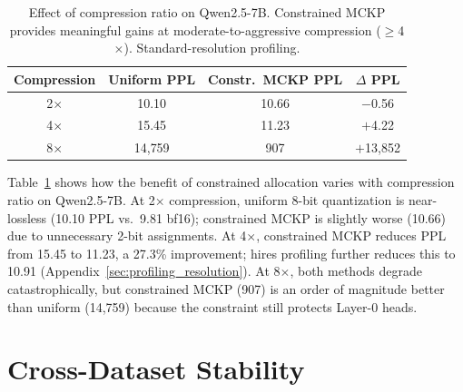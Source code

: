 \begin{table}[t]
\centering
\small
\caption{Effect of compression ratio on Qwen2.5-7B. Constrained MCKP provides meaningful gains at moderate-to-aggressive compression ($\geq$4$\times$). Standard-resolution profiling.}
\label{tab:budget_sweep}
\begin{tabular}{cccc}
\toprule
Compression & Uniform PPL & Constr.\ MCKP PPL & $\Delta$ PPL \\
\midrule
2$\times$ & 10.10 & 10.66 & $-$0.56 \\
4$\times$ & 15.45 & 11.23 & $+$4.22 \\
8$\times$ & 14{,}759 & 907 & $+$13{,}852 \\
\bottomrule
\end{tabular}
\end{table}

Table~\ref{tab:budget_sweep} shows how the benefit of constrained allocation varies with compression ratio on Qwen2.5-7B.
At 2$\times$ compression, uniform 8-bit quantization is near-lossless (10.10 PPL vs.\ 9.81 bf16); constrained MCKP is slightly worse (10.66) due to unnecessary 2-bit assignments.
At 4$\times$, constrained MCKP reduces PPL from 15.45 to 11.23, a 27.3\% improvement; hires profiling further reduces this to 10.91 (Appendix~\ref{sec:profiling_resolution}).
At 8$\times$, both methods degrade catastrophically, but constrained MCKP (907) is an order of magnitude better than uniform (14{,}759) because the constraint still protects Layer-0 heads.

\section{Cross-Dataset Stability}
\label{sec:cross_dataset}

